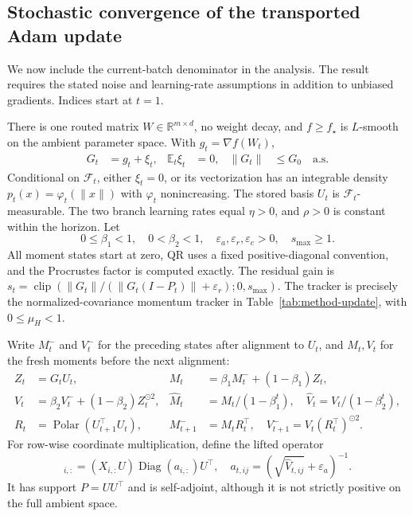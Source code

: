\subsection{Stochastic convergence of the transported Adam update}
\label{app:actual-adam}
We now include the current-batch denominator in the analysis. The result
requires the stated noise and learning-rate assumptions in addition to
unbiased gradients. Indices start at $t=1$.

\begin{assumption}
\label{ass:actual-adam}
There is one routed matrix $W\in\mathbb R^{m\times d}$, no weight decay,
and $f\ge f_\star$ is $L$-smooth on the ambient parameter space.
With $g_t=\nabla f(W_t)$,
\begin{align}
 G_t&=g_t+\xi_t,&\mathbb E_t\xi_t&=0,&\|G_t\|&\le G_0\quad\text{a.s.}
\end{align}
Conditional on $\mathcal F_t$, either $\xi_t=0$, or its vectorization has
an integrable density $p_t(x)=\varphi_t(\|x\|)$ with
$\varphi_t$ nonincreasing. The stored basis $U_t$ is
$\mathcal F_t$-measurable. The two branch learning rates equal $\eta>0$,
and $\rho>0$ is constant within the horizon. Let
\begin{equation}
 0\le\beta_1<1,\quad0<\beta_2<1,\quad
 \varepsilon_a,\varepsilon_r,\varepsilon_c>0,\quad s_{\max}\ge1.
\end{equation}
All moment states start at zero, QR uses a fixed positive-diagonal
convention, and the Procrustes factor is computed exactly. The residual gain
is $s_t=\operatorname{clip}(\|G_t\|/(\|G_t(I-P_t)\|+\varepsilon_r);0,s_{\max})$.
The tracker is precisely the normalized-covariance momentum tracker in
Table~\ref{tab:method-update}, with $0\le\mu_H<1$.
\end{assumption}

Write $M_t^-$ and $V_t^-$ for the preceding states after alignment to $U_t$,
and $M_t,V_t$ for the fresh moments before the next alignment:
\begin{align}
 Z_t&=G_tU_t,&M_t&=\beta_1M_t^-+(1-\beta_1)Z_t,\\
 V_t&=\beta_2V_t^-+(1-\beta_2)Z_t^{\odot2},&
 \widehat M_t&=M_t/(1-\beta_1^t),\quad
 \widehat V_t=V_t/(1-\beta_2^t),\\
 R_t&=\operatorname{Polar}(U_{t+1}^\top U_t),&
 M_{t+1}^-&=M_tR_t^\top,\quad
 V_{t+1}^-=V_t(R_t^\top)^{\odot2}.\label{eq:actual-recursion}
\end{align}
For row-wise coordinate multiplication, define the lifted operator
\begin{equation}
 [\mathcal A(U,a)X]_{i,:}
   =(X_{i,:}U)\operatorname{Diag}(a_{i,:})U^\top,
 \quad
 a_{t,ij}=(\sqrt{\widehat V_{t,ij}}+\varepsilon_a)^{-1}.
\end{equation}
It has support $P=UU^\top$ and is self-adjoint, although it is not
strictly positive on the full ambient space.

